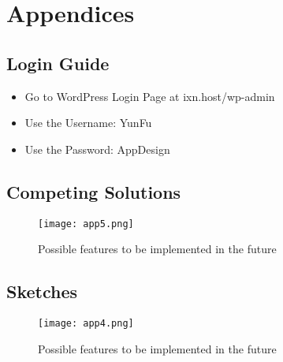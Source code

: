\documentclass[fontsize=11pt]{extarticle}
\numberwithin{figure}{section} %
\begin{document}
\printbibliography


\newpage
\section{Appendices}

\subsection{Login Guide}
\begin{itemize}

  \item Go to WordPress Login Page at ixn.host/wp-admin
  \item Use the Username: YunFu
  \item Use the Password: AppDesign

\end{itemize}

\begin{landscape}
\subsection{Competing Solutions}
  \begin{figure}[H]
      \centering
      \texttt{[image: app5.png]}
      \caption{Possible features to be implemented in the future}
 \end{figure}
 \end{landscape}

 \newpage


\begin{landscape}
\subsection{Sketches}
 \begin{figure}[H]
      \centering
      \texttt{[image: app4.png]}
      \caption{Possible features to be implemented in the future}
 \end{figure}
\end{landscape}

 \newpage
\end{document}
